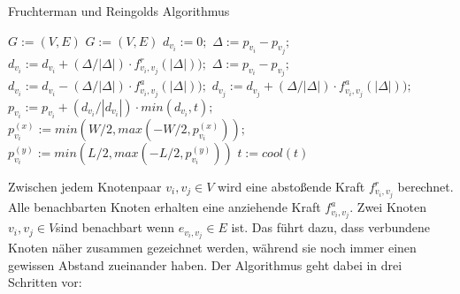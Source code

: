 \begin{algorithm}[t]
	\centering
	\caption[Ein Algorithmus]{Fruchterman und Reingolds Algorithmus} \label{algo_1}
	\begin{algorithmic}
		\REQUIRE \begin{math} G:= (V,E) \end{math}
		\ENSURE \begin{math} G:= (V,E) \end{math}
		\STATE $d_{v_{i}} := 0;$
		\STATE $\Delta := p_{v_{i}} - p_{v_{j}};$
		\STATE $d_{v_{i}} := d_{v_{i}} + (\Delta / |\Delta|) \cdot f^{r}_{v_{i},v_{j}}(|\Delta|));$
		\ENDIF
		\ENDFOR
		\ENDFOR
		\newline
		\STATE $\Delta := p_{v_{i}} - p_{v_{j}};$
		\STATE $d_{v_{i}} := d_{v_{i}} - (\Delta / |\Delta|) \cdot f^{a}_{v_{i},v_{j}}(|\Delta|));$
		\STATE $d_{v_{j}} := d_{v_{j}} + (\Delta / |\Delta|) \cdot f^{a}_{v_{i},v_{j}}(|\Delta|));$
		\ENDFOR
		\newline
		\STATE $p_{v_{i}} := p_{v_{i}} + ( d_{v_{i}}/ |d_{v_{i}}|) \cdot min ( d_{v_{i}}, t );$
		\STATE $p_{v_{i}}^{(x)} := min(W/2, max(-W/2, p_{v_{i}}^{(x)}));$
		\STATE $p_{v_{i}}^{(y)} := min(L/2, max(-L/2, p_{v_{i}}^{(y)}))$
		\ENDFOR
		\STATE $t:= cool(t)$
		\ENDFOR
	\end{algorithmic}
\end{algorithm}

Zwischen jedem Knotenpaar $v_{i},v_{j} \in V$ wird eine abstoßende Kraft \begin{math} f^{r}_{v_{i},v_{j}}  \end{math} berechnet.   Alle
benachbarten Knoten erhalten eine anziehende Kraft \begin{math} f^{a}_{v_{i},v_{j}} \end{math}. Zwei Knoten \begin{math} v_{i},v_{j} \in V \end{math}sind benachbart wenn \begin{math} e_{v_{i},v_{j}} \in E \end{math} ist. Das führt dazu, dass verbundene Knoten näher zusammen
gezeichnet werden, während sie noch immer einen gewissen Abstand zueinander
haben. Der Algorithmus geht dabei in drei Schritten vor:

